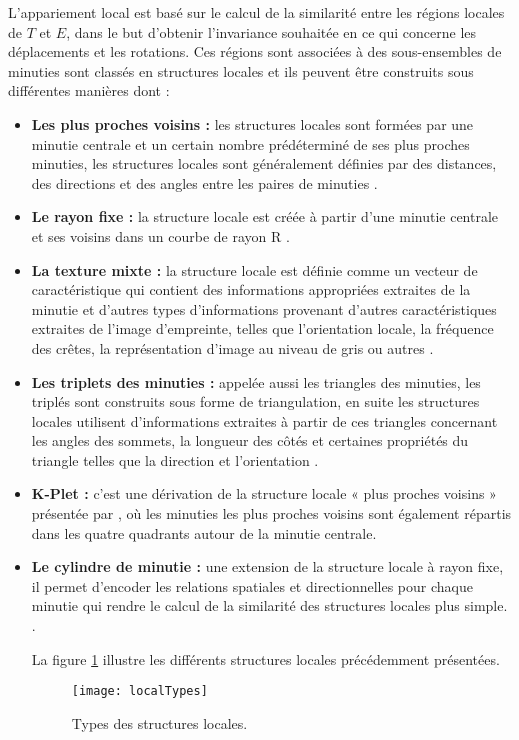 L'appariement local est basé sur le calcul de la similarité entre les régions locales de $ T $ et $ E $, dans le but d'obtenir l'invariance souhaitée en ce qui concerne les déplacements et les rotations. Ces régions sont associées à des sous-ensembles de minuties sont classés en structures locales et ils peuvent être construits sous différentes manières dont :
\begin{itemize}
	\item \textbf{Les plus proches voisins :} les structures locales sont formées par une minutie centrale et un certain nombre prédéterminé de ses plus proches minuties, les structures locales sont généralement définies par des distances, des directions et des angles entre les paires de minuties \citep{jiang2000fingerprint}.
	\item \textbf{Le rayon fixe :} la  structure locale est créée à partir d'une minutie centrale et ses voisins dans un courbe de rayon R \citep{ratha2000robust}.
	\item \textbf{La texture mixte :} la structure locale est définie comme un vecteur de caractéristique qui contient des informations appropriées extraites de la minutie et d'autres types d'informations provenant d'autres caractéristiques extraites de l'image d'empreinte, telles que l'orientation locale, la fréquence des crêtes, la représentation d'image au niveau de gris ou autres \citep{benhammadi2007fingerprint}.
	\item \textbf{Les triplets des minuties : }appelée aussi les triangles des minuties, les triplés sont construits sous forme de triangulation, en suite les structures locales utilisent d'informations extraites à partir de ces triangles concernant les angles des sommets, la longueur des côtés et certaines propriétés du triangle telles que la direction et l'orientation \citep{maltoni2009handbook}.
	\item \textbf{K-Plet :} c'est une dérivation de la structure locale «  plus proches voisins » présentée par \citep{chikkerur2006k}, où les minuties les plus proches voisins sont également répartis dans les quatre quadrants autour de la minutie centrale.
	\item \textbf{Le cylindre de minutie :} une extension de la structure locale à rayon fixe, il permet d'encoder les relations spatiales et directionnelles pour chaque minutie qui rendre le calcul de la similarité des structures locales plus simple. \citep{cappelli2010minutia}.
	
	La figure \ref{fig:chapitre2localTypes} illustre les différents structures locales précédemment présentées.
	
	\begin{figure}[H]
		\centering
		\texttt{[image: localTypes]}
		\caption{ Types des structures locales.}
		\label{fig:chapitre2localTypes}
	\end{figure}
\end{itemize}	
